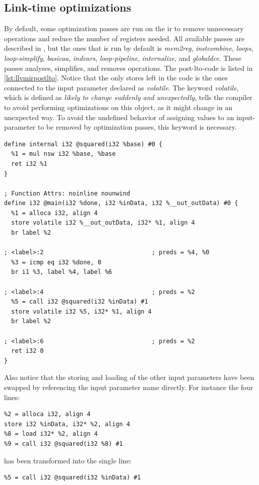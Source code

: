 \subsection{Link-time optimizations}
By default, some optimization passes are run on the \gls{ir} to remove unnecessary operations and reduce the number of registers needed. All available passes are described in \cite{llvmpasses}, but the ones that is run by default is \textit{mem2reg}, \textit{instcombine}, \textit{loops}, \textit{loop-simplify}, \textit{basicaa}, \textit{indvars}, \textit{loop-pipeline}, \textit{internalize}, and \textit{globaldce}. These passes analyses, simplifies, and removes operations. The post-\gls{lto}-code is listed in \cref{lst:llvmirpostlto}. Notice that the only stores left in the code is the ones connected to the input parameter declared as \textit{volatile}. The keyword \textit{volatile}, which is defined as \textit{likely to change suddenly and unexpectedly}, tells the compiler to avoid performing optimizations on this object, as it might change in an unexpected way. To avoid the undefined behavior of assigning values to an input-parameter to be removed by optimization passes, this keyword is necessary.

\begin{lstlisting}[caption={LLVM IR after LTO},label=lst:llvmirpostlto]
define internal i32 @squared(i32 %base) #0 {
  %1 = mul nsw i32 %base, %base
  ret i32 %1
}

; Function Attrs: noinline nounwind
define i32 @main(i32 %done, i32 %inData, i32 %__out_outData) #0 {
  %1 = alloca i32, align 4
  store volatile i32 %__out_outData, i32* %1, align 4
  br label %2

; <label>:2                              ; preds = %4, %0
  %3 = icmp eq i32 %done, 0
  br i1 %3, label %4, label %6

; <label>:4                              ; preds = %2
  %5 = call i32 @squared(i32 %inData) #1
  store volatile i32 %5, i32* %1, align 4
  br label %2

; <label>:6                              ; preds = %2
  ret i32 0
}
\end{lstlisting}

Also notice that the storing and loading of the other input parameters have been swapped by referencing the input parameter name directly. For instance the four lines:

\begin{lstlisting}
%2 = alloca i32, align 4
store i32 %inData, i32* %2, align 4
%8 = load i32* %2, align 4
%9 = call i32 @squared(i32 %8) #1
\end{lstlisting}
has been transformed into the single line:
\begin{lstlisting}
%5 = call i32 @squared(i32 %inData) #1
\end{lstlisting}
